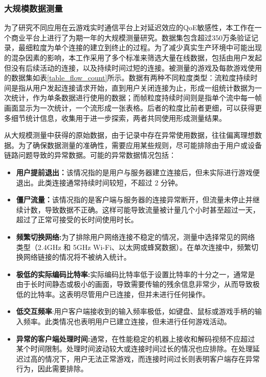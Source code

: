 \subsubsection{大规模数据测量}
为了研究不同应用在云游戏实时通信平台上对延迟效应的QoE敏感性，本工作在一个商业平台上进行了为期一年的大规模测量研究。数据集包含超过350万条验证记录，最细粒度为单个连接的建立到终止的过程。为了减少真实生产环境中可能出现的混杂因素的影响，本工作采用了多个标准来筛选大量在线数据，包括由用户发起但没有后续活动的连接，以及持续时间过短的连接。被测量的游戏及每款游戏使用的数据集如表\ref{table_flow_count}所示。数据有两种不同粒度类型：流粒度持续时间是指从用户发起连接请求开始，直到用户关闭连接为止，形成一组统计数据为一次统计，作为单条数据进行使用的数据；而帧粒度持续时间则是指单个流中每一帧画面显示为一次统计，一个流形成一张表格。后者的粒度比前者更细，可以获得更多细节统计信息，收集用于进一步探索，两者共同使用形成测量结果。




从大规模测量中获得的原始数据，由于记录中存在异常使用数据，往往偏离理想数据。为了确保数据测量的准确性，需要应用某些规则，尽可能排除由于用户或设备链路问题导致的异常数据。可能的异常数据情况包括：
\begin{itemize} 
\item \textbf{用户提前退出：}该情况指的是用户与服务器建立连接后，但未实际进行游戏便退出。此类连接通常持续时间较短，不超过 2 分钟。 

\item \textbf{僵尸流量：}该情况指的是客户端与服务器的连接异常断开，但流量未停止并继续计数，导致数据不正确。这样可能导致流量被计量几个小时甚至超过一天，超过了正常可接受的长时间使用时长。 

\item \textbf{频繁切换网络:}为了排除用户网络连接不稳定的情况，测量中选择常见的网络类型（2.4GHz 和 5GHz Wi-Fi、以太网或蜂窝数据）。在单次连接中，频繁切换网络链接的情况将不被纳入统计。 

\item \textbf{极低的实际编码比特率:}实际编码比特率低于设置比特率的十分之一，通常是由于长时间静态或极小的画面，导致需要传输的残余信息非常少，从而导致极低的比特率。这表明尽管用户已连接，但并未进行任何操作。 

\item \textbf{低交互频率}:用户客户端接收到的输入频率极低，如键盘、鼠标或游戏手柄的输入频率。此类情况也表明用户已建立连接，但未进行任何游戏活动。 

\item \textbf{异常的客户端处理时间:}通常，在性能稳定的机器上接收和解码视频不应超过某个时间限制。处理时间波动较大或连接时间过长的情况也应排除。在处理延迟过高的情况下，用户无法正常游戏，而连接时间过长则表明客户端存在异常行为，因此需要排除。 

\end{itemize}

